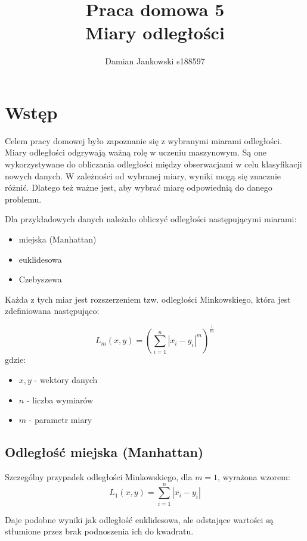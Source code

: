 \documentclass{article}
\title{Praca domowa 5\\Miary odległości}
\author{Damian Jankowski s188597}
\begin{document}
\maketitle

\section{Wstęp}

Celem pracy domowej było zapoznanie się z wybranymi miarami odległości.
Miary odległości odgrywają ważną rolę w uczeniu maszynowym. Są one
wykorzystywane do obliczania odległości między obserwacjami w celu
klasyfikacji nowych danych. W zależności od wybranej miary, wyniki
mogą się znacznie różnić. Dlatego też ważne jest, aby wybrać miarę
odpowiednią do danego problemu.

Dla przykładowych danych należało obliczyć odległości następującymi miarami:
\begin{itemize}
    \item miejska (Manhattan)
    \item euklidesowa
    \item Czebyszewa
\end{itemize}

Każda z tych miar jest rozszerzeniem tzw. odległości Minkowskiego, która jest
zdefiniowana następująco:

\begin{equation}
    L_m(x, y) = \left( \sum_{i=1}^{n} |x_i - y_i|^m \right)^{\frac{1}{m}}
\end{equation}
gdzie:
\begin{itemize}
    \item $x, y$ - wektory danych
    \item $n$ - liczba wymiarów
    \item $m$ - parametr miary
\end{itemize}

\subsection{Odległość miejska (Manhattan)}
Szczególny przypadek odległości Minkowskiego, dla $m=1$, wyrażona
wzorem:
\begin{equation}
    L_1(x, y) = \sum_{i=1}^{n} |x_i - y_i|
\end{equation}

Daje podobne wyniki jak odległość euklidesowa, ale odstające
wartości są stłumione przez brak podnoszenia ich do kwadratu.
\end{document}
